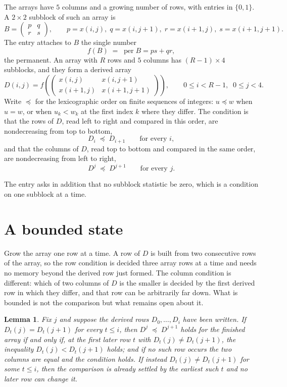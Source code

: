 \documentclass[11pt,a4paper]{article}
\theoremstyle{plain}
\newtheorem{lemma}[theorem]{Lemma}
\theoremstyle{definition}
\begin{document}
The arrays have $5$ columns and a growing number of rows, with entries in $\{0,1\}$. A
$2\times2$ subblock of such an array is
\[
B=\begin{pmatrix} p & q \\ r & s \end{pmatrix},
\qquad p=x(i,j),\; q=x(i,j+1),\; r=x(i+1,j),\; s=x(i+1,j+1).
\]
The entry attaches to $B$ the single number
\[
f(B)\;=\;\operatorname{per}B=ps+qr,
\]
the permanent. An array with $R$ rows and $5$ columns has $(R-1)\times4$ subblocks, and they
form a derived array
\[
D(i,j)=f\!\left(\begin{pmatrix} x(i,j) & x(i,j+1) \\ x(i+1,j) & x(i+1,j+1)\end{pmatrix}
\right),\qquad 0\le i<R-1,\;\; 0\le j<4 .
\]
Write $\preceq$ for the lexicographic order on finite sequences of integers: $u\preceq w$ when
$u=w$, or when $u_k<w_k$ at the first index $k$ where they differ. The condition is that the
rows of $D$, read left to right and compared in this order, are nondecreasing from top to bottom,
\[
D_{i}\;\preceq\;D_{i+1}\qquad\text{for every } i,
\]
and that the columns of $D$, read top to bottom and compared in the same order, are nondecreasing
from left to right,
\[
D^{j}\;\preceq\;D^{j+1}\qquad\text{for every } j .
\]

The entry asks in addition that no subblock statistic be zero, which is a condition on one subblock at a time.


\section{A bounded state}

Grow the array one row at a time. A row of $D$ is built from two consecutive rows of the array,
so the row condition is decided three array rows at a time and needs no memory beyond the
derived row just formed. The column condition is different: which of two columns of $D$ is the
smaller is decided by the first derived row in which they differ, and that row can be
arbitrarily far down. What is bounded is not the comparison but what remains open about it.

\begin{lemma}\label{lem:bits}
Fix $j$ and suppose the derived rows $D_0,\dots,D_i$ have been written. If $D_t(j)=D_t(j+1)$ for
every $t\le i$, then $D^{j}\;\preceq\;D^{j+1}$ holds for the finished array if and only if,
at the first later row $t$ with $D_t(j)\neq D_t(j+1)$, the inequality $D_t(j)<D_t(j+1)$
holds; and if no such row occurs the two columns are equal and the condition holds. If instead
$D_t(j)\neq D_t(j+1)$ for some $t\le i$, then the comparison is already settled by the earliest
such $t$ and no later row can change it.
\end{lemma}
\end{document}
